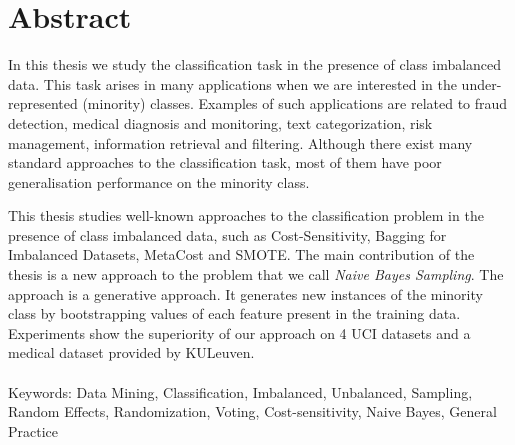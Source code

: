 \chapter*{Abstract}
In this thesis we study the classification task in the presence of class imbalanced data. This task arises in many applications when we are interested in the under-represented (minority) classes. Examples of such applications are related to fraud detection, medical diagnosis and monitoring, text categorization, risk management, information retrieval and filtering. Although there exist many standard approaches to the classification task, most of them have poor generalisation performance on the minority class. 

This thesis studies well-known approaches to the classification problem in the presence of class imbalanced data, such as  Cost-Sensitivity, Bagging for Imbalanced Datasets, MetaCost and SMOTE. The main contribution of the thesis is a new approach to the problem that we call \textit{Naive Bayes Sampling}. The approach is a generative approach. It generates new instances of the minority class by bootstrapping values of each feature present in the training data. Experiments show the superiority of our approach on 4 UCI datasets and a medical dataset provided by KULeuven.
\\\\
Keywords: Data Mining, Classification, Imbalanced, Unbalanced, Sampling, Random Effects, Randomization, Voting, Cost-sensitivity, Naive Bayes, General Practice
